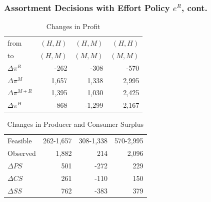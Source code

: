 \documentclass[aspectratio=169,11pt]{beamer}
\begin{document}
\begin{frame}
\frametitle{Assortment Decisions with Effort Policy $e^R$, cont.}
\vspace{-0.4in}
\begin{table}[htp]
\caption{Changes in Profit}
\begin{center}
\begin{tabular}{|l| rrr|}
\hline
from &\hspace{0.15in} $(H,H)$ &\hspace{0.15in} $(H,M)$ & \hspace{0.15in}$(H,H)$ \\
to &\hspace{0.15in} $(H,M)$ & \hspace{0.15in}$(M,M)$ & \hspace{0.15in}$(M,M)$\\
 \hline
$\Delta \pi^R$&   -262 & -308& -570 \\
$\Delta \pi^M$ &  1,657 & 1,338 & 2,995 \\
$\Delta \pi^{M+R}$&   1,395 & 1,030& 2,425 \\
$\Delta \pi^H$  &-868 & -1,299 & -2,167 \\
 \hline
 \end{tabular}
\end{center}
\label{tab:assortmentonly2}
\end{table}
\vspace{-0.3in}
\begin{table}[htp]
\begin{center}
\caption{Changes in Producer and Consumer Surplus}
\begin{tabular}{|l| rrr|}
\hline
Feasible & 262-1,657 & 308-1,338&570-2,995 \\
Observed & 1,882 & 214& 2,096 \\
\hline
$\Delta PS$ & 501 & -272 & 229 \\
$\Delta CS$ &261 & -110 & 150 \\
$\Delta SS$ &762 & -383 & 379 \\ \hline
\end{tabular}
\end{center}
\label{tab:assortmentonly3}
\end{table}

\end{frame}
\end{document}
